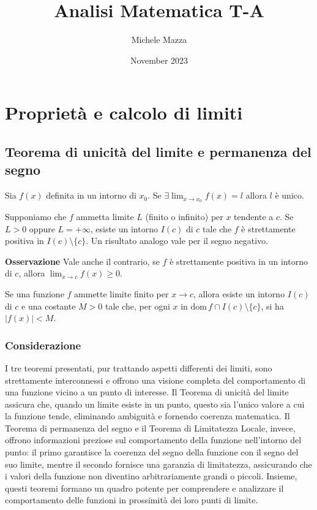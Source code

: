 \documentclass{book}
\title{Analisi Matematica T-A}
\author{Michele Mazza}
\date{November 2023}
\begin{document}
\frontmatter
\maketitle
\tableofcontents
\mainmatter


\chapter{Proprietà e calcolo di limiti}

\section{Teorema di unicità del limite e permanenza del segno}

\begin{theorem}
    Sia \(f(x)\) definita in un intorno di \(x_0\). Se \(\exists \lim_{x \to x_0} f(x) = l\) allora \(l\) è unico.
\end{theorem}


\begin{theorem}
    Supponiamo che \(f\) ammetta limite \(L\) (finito o infinito) per \(x\) tendente a \(c\). Se \(L > 0\) oppure \(L = +\infty\), esiste un intorno \(I(c)\) di \(c\) tale che \(f\) è strettamente positiva in \(I(c) \setminus \{c\}\). Un risultato analogo vale per il segno negativo.

    \textbf{Osservazione}
    Vale anche il contrario, se \(f\) è strettamente positiva in un intorno di \(c\), allora \(\lim_{x \to c} f(x) \geq 0\).
\end{theorem}

\begin{theorem}
    Se una funzione \( f \) ammette limite finito per \( x \to c \), allora esiste un intorno \( I(c) \) di \( c \) e una costante \( M > 0 \) tale che, per ogni \( x \) in \( \text{dom}\,f \cap I(c) \setminus \{c\} \), si ha \( |f(x)| < M \).
\end{theorem}

\subsection*{Considerazione}

I tre teoremi presentati, pur trattando aspetti differenti dei limiti, sono strettamente interconnessi e offrono una visione completa del comportamento di una funzione vicino a un punto di interesse. Il Teorema di unicità del limite assicura che, quando un limite esiste in un punto, questo sia l'unico valore a cui la funzione tende, eliminando ambiguità e fornendo coerenza matematica. Il Teorema di permanenza del segno e il Teorema di Limitatezza Locale, invece, offrono informazioni preziose sul comportamento della funzione nell'intorno del punto: il primo garantisce la coerenza del segno della funzione con il segno del suo limite, mentre il secondo fornisce una garanzia di limitatezza, assicurando che i valori della funzione non diventino arbitrariamente grandi o piccoli. Insieme, questi teoremi formano un quadro potente per comprendere e analizzare il comportamento delle funzioni in prossimità dei loro punti di limite.
\end{document}
